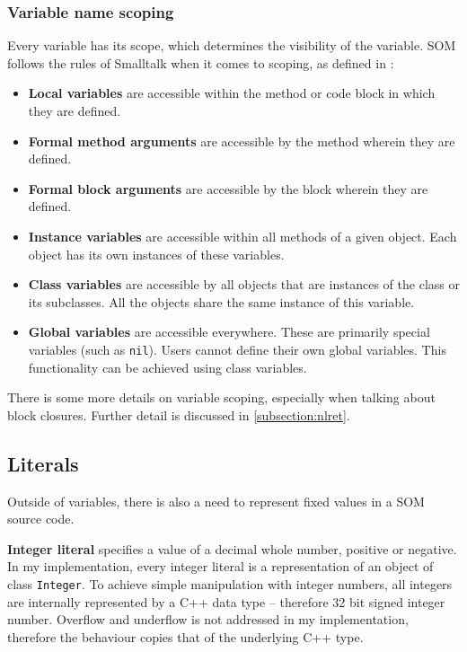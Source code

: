 \documentclass[thesis=M,english]{FITthesis}[2019/12/23]
\begin{document}
\subsubsection{Variable name scoping}
Every variable has its scope, which determines the visibility of the variable. SOM follows the rules of Smalltalk
when it comes to scoping, as defined in \cite{smalltalk-essentials}:

\begin{itemize}
	\item \textbf{Local variables} are accessible within the method or code block in which they are defined.
	\item \textbf{Formal method arguments} are accessible by the method wherein they are defined.
	\item \textbf{Formal block arguments} are accessible by the block wherein they are defined.
	\item \textbf{Instance variables} are accessible within all methods of a given object. Each object
		has its own instances of these variables.
	\item \textbf{Class variables} are accessible by all objects that are instances of the class or its
		subclasses. All the objects share the same instance of this variable.
	\item \textbf{Global variables} are accessible everywhere. These are primarily special variables
		(such as \texttt{nil}). Users cannot define their own global variables. This functionality can be
		achieved using class variables.
\end{itemize}

There is some more details on variable scoping, especially when talking about block closures. Further detail
is discussed in \ref{subsection:nlret}.

\subsection{Literals}
Outside of variables, there is also a need to represent fixed values in a SOM source code. 

\textbf{Integer literal} specifies a value of a decimal whole number, positive or negative.
In my implementation, every integer literal is a representation of an object of class \texttt{Integer}. 
To achieve simple manipulation with integer numbers, all integers are internally represented by a C++
data type \texttt{} -- therefore 32 bit signed integer number. Overflow and underflow is not
addressed in my implementation, therefore the behaviour copies that of the underlying C++ type.
\end{document}
